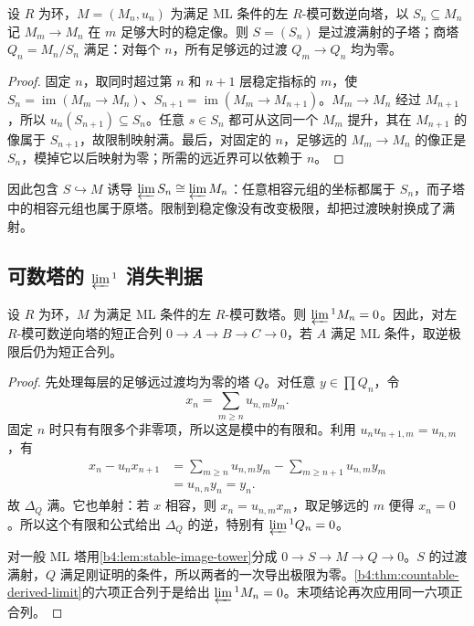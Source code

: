 \begin{lemma}\label{b4:lem:stable-image-tower}
	设 \(R\) 为环，\(M=(M_n,u_n)\) 为满足 ML 条件的左 \(R\)-模可数逆向塔，以 \(S_n\subseteq M_n\) 记 \(M_m\to M_n\) 在 \(m\) 足够大时的稳定像。则 \(S=(S_n)\) 是过渡满射的子塔；商塔 \(Q_n=M_n/S_n\) 满足：对每个 \(n\)，所有足够远的过渡 \(Q_m\to Q_n\) 均为零。
\end{lemma}
\begin{proof}
	固定 \(n\)，取同时超过第 \(n\) 和 \(n+1\) 层稳定指标的 \(m\)，使 \(S_n=\operatorname{im}(M_m\to M_n)\)、\(S_{n+1}=\operatorname{im}(M_m\to M_{n+1})\)。\(M_m\to M_n\) 经过 \(M_{n+1}\)，所以 \(u_n(S_{n+1})\subseteq S_n\)。任意 \(s\in S_n\) 都可从这同一个 \(M_m\) 提升，其在 \(M_{n+1}\) 的像属于 \(S_{n+1}\)，故限制映射满。最后，对固定的 \(n\)，足够远的 \(M_m\to M_n\) 的像正是 \(S_n\)，模掉它以后映射为零；所需的远近界可以依赖于 \(n\)。
\end{proof}

因此包含 \(S\hookrightarrow M\) 诱导 \(\varprojlim S_n\cong\varprojlim M_n\)：任意相容元组的坐标都属于 \(S_n\)，而子塔中的相容元组也属于原塔。限制到稳定像没有改变极限，却把过渡映射换成了满射。

\subsection{\texorpdfstring{可数塔的 \(\varprojlim{}^1\) 消失判据}{可数塔的 lim1 消失判据}}
\label{b4:subsec:1304:02}

\begin{theorem}\label{b4:thm:mittag-leffler-vanishing}
	设 \(R\) 为环，\(M\) 为满足 ML 条件的左 \(R\)-模可数塔。则 \(\varprojlim{}^1M_n=0\)。因此，对左 \(R\)-模可数逆向塔的短正合列 \(0\to A\to B\to C\to0\)，若 \(A\) 满足 ML 条件，取逆极限后仍为短正合列。
\end{theorem}
\begin{proof}
	先处理每层的足够远过渡均为零的塔 \(Q\)。对任意 \(y\in\prod Q_n\)，令
	\[
		x_n=\sum_{m\ge n}u_{n,m}y_m.
	\]
	固定 \(n\) 时只有有限多个非零项，所以这是模中的有限和。利用 \(u_nu_{n+1,m}=u_{n,m}\)，有
	\[
		\begin{aligned}
			x_n-u_nx_{n+1} &=\sum_{m\ge n}u_{n,m}y_m-\sum_{m\ge n+1}u_{n,m}y_m\\
			&=u_{n,n}y_n=y_n.
		\end{aligned}
	\]
	故 \(\Delta_Q\) 满。它也单射：若 \(x\) 相容，则 \(x_n=u_{n,m}x_m\)，取足够远的 \(m\) 便得 \(x_n=0\)。所以这个有限和公式给出 \(\Delta_Q\) 的逆，特别有 \(\varprojlim{}^1Q_n=0\)。

	对一般 ML 塔用\cref{b4:lem:stable-image-tower}分成 \(0\to S\to M\to Q\to0\)。\(S\) 的过渡满射，\(Q\) 满足刚证明的条件，所以两者的一次导出极限为零。\cref{b4:thm:countable-derived-limit}的六项正合列于是给出 \(\varprojlim{}^1M_n=0\)。末项结论再次应用同一六项正合列。
\end{proof}

